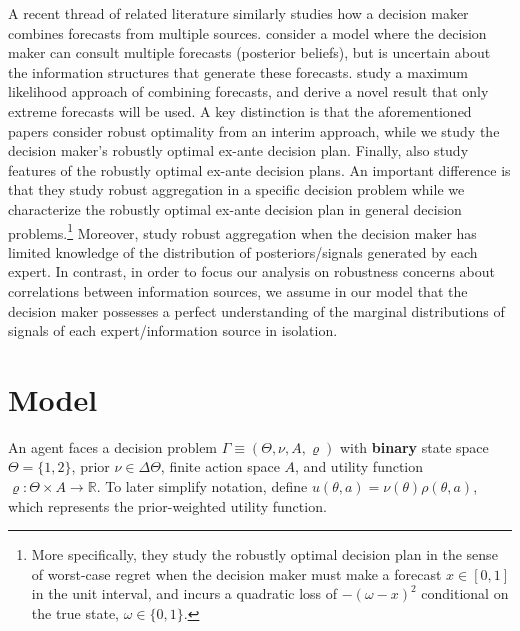 \documentclass[11pt]{article}
\theoremstyle{plain}
\theoremstyle{remark}
\begin{document}
A recent thread of related literature similarly studies how a decision maker combines forecasts from multiple sources.  \citet{levy2020combining} consider a model where the decision maker can consult multiple forecasts (posterior beliefs), but is uncertain about the information structures that generate these forecasts. \citet{razin2020drowning} study a maximum likelihood approach of combining forecasts, and derive a novel result that only extreme forecasts will be used. A key distinction is that the aforementioned papers consider robust optimality from an interim approach, while we study the decision maker's robustly optimal ex-ante decision plan. Finally, \citet*{ArieliE12135} also study features of the robustly optimal ex-ante decision plans. An important difference is that they study robust aggregation in a specific decision problem while we characterize the robustly optimal ex-ante decision plan in general decision problems.\footnote{More specifically, they study the robustly optimal decision plan in the sense of worst-case regret when the decision maker must make a forecast $x \in [0,1]$ in the unit interval, and incurs a quadratic loss of $- (\omega - x)^2$ conditional on the true state, $\omega \in \{0,1\}$.}  Moreover, \citet*{ArieliE12135} study robust aggregation when the decision maker has limited knowledge of the distribution of posteriors/signals generated by each expert. In contrast, in order to focus our analysis on robustness concerns about correlations between information sources, we assume in our model that the decision maker possesses a perfect understanding of the marginal distributions of signals of each expert/information source in isolation. 












	
\section{Model}\label{section-model}
	
An agent faces a decision problem $\Gamma\equiv(\Theta,\nu,A,\varrho)$ with \textbf{binary} state space $\Theta=\{1,2\}$, prior $\nu\in\Delta\Theta$, finite action space $A$, and utility function $\varrho:\Theta\times A\rightarrow \mathbb{R}$. To later simplify notation, define $u(\theta,a)=\nu(\theta)\rho(\theta,a)$, which represents the prior-weighted utility function. 
\end{document}
